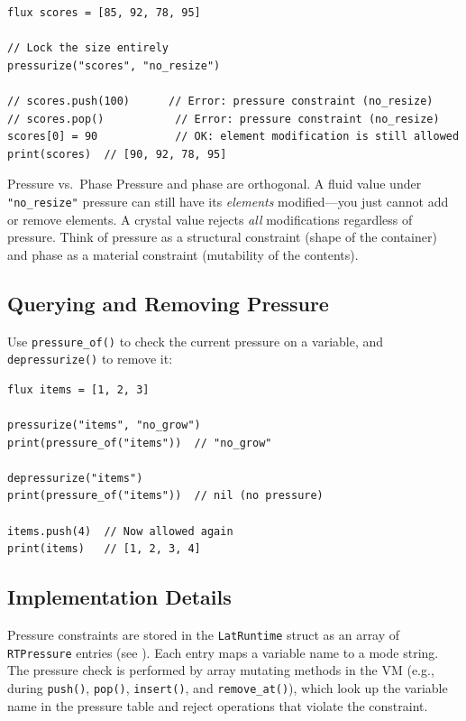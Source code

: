 \begin{lstlisting}[language=Lattice, caption={Different pressure modes}]
flux scores = [85, 92, 78, 95]

// Lock the size entirely
pressurize("scores", "no_resize")

// scores.push(100)      // Error: pressure constraint (no_resize)
// scores.pop()           // Error: pressure constraint (no_resize)
scores[0] = 90            // OK: element modification is still allowed
print(scores)  // [90, 92, 78, 95]
\end{lstlisting}

\begin{notebox}{Pressure vs.\ Phase}
Pressure and phase are orthogonal.
A fluid value under \lstinline|"no_resize"| pressure can still have its \emph{elements} modified---you just cannot add or remove elements.
A crystal value rejects \emph{all} modifications regardless of pressure.
Think of pressure as a structural constraint (shape of the container) and phase as a material constraint (mutability of the contents).
\end{notebox}

\subsection{Querying and Removing Pressure}

Use \lstinline|pressure_of()| to check the current pressure on a variable, and \lstinline|depressurize()| to remove it:

\begin{lstlisting}[language=Lattice, caption={Querying and removing pressure}]
flux items = [1, 2, 3]

pressurize("items", "no_grow")
print(pressure_of("items"))  // "no_grow"

depressurize("items")
print(pressure_of("items"))  // nil (no pressure)

items.push(4)  // Now allowed again
print(items)   // [1, 2, 3, 4]
\end{lstlisting}

\subsection{Implementation Details}

Pressure constraints are stored in the \lstinline|LatRuntime| struct as an array of \lstinline|RTPressure| entries (see ).
Each entry maps a variable name to a mode string.
The pressure check is performed by array mutating methods in the VM (e.g., during \lstinline|push()|, \lstinline|pop()|, \lstinline|insert()|, and \lstinline|remove_at()|), which look up the variable name in the pressure table and reject operations that violate the constraint.

